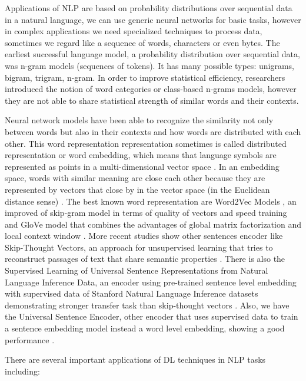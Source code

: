 \documentclass[12pt]{report}
\begin{document}
Applications of \ac{NLP} are based on probability distributions over sequential data in a natural language, we can use generic neural networks for basic tasks, however in complex applications we need specialized techniques to process data, sometimes we regard like a sequence of words, characters or even bytes. The earliest successful language model, a probability distribution over sequential data, was n-gram models (sequences of tokens). It has many possible types: unigrams, bigram, trigram, n-gram. In order to improve statistical efficiency, researchers introduced the notion of word categories or class-based n-grams models, however they are not able to share statistical strength of similar words and their contexts. 

Neural network  models have been able to recognize the similarity not only between words but also in their contexts and how words are distributed with each other. This word representation  representation sometimes is called  distributed representation or word embedding, which means that language symbols are represented as points in a multi-dimensional vector space . In an embedding space, words with similar meaning are close each other \cite{Russell2010} \cite{Goodfellow2016} because they are represented by vectors that close by in the vector space (in the Euclidean distance sense) . The best known word representation are Word2Vec Models \cite{Mikolov2013}, an improved of skip-gram model in terms of quality of vectors and speed training \cite{Mikolov2013} and GloVe model that combines the advantages of global matrix factorization and local context window \cite{Pennington2014}. More recent studies show other sentences encoder like Skip-Thought Vectors, an approach for unsupervised learning that tries to reconstruct passages of text that share semantic properties \cite{Kiros2015}. There is also the  Supervised Learning of Universal Sentence Representations from Natural Language Inference Data, an encoder using pre-trained sentence level embedding with supervised data of Stanford Natural Language Inference datasets demonstrating stronger transfer task than skip-thought vectors \cite{ Conneau2017}. Also, we have the Universal Sentence Encoder, other encoder that uses supervised data to train a sentence embedding model instead a word level embedding, showing a good performance \cite{Cer2018}. 

There are several important applications of \ac{DL} techniques in \ac{NLP} tasks including:
\end{document}
